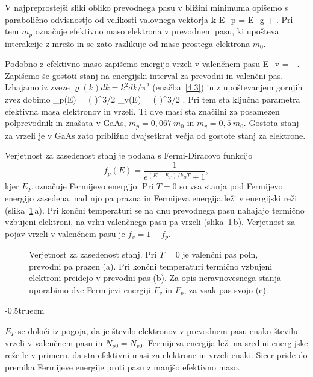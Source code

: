 V najpreprostejši sliki obliko prevodnega pasu v bližini minimuma opišemo 
s parabolično odvisnostjo od velikosti valovnega vektorja $\mathbf{k}$
\beq
E_p = E_g + .
\label{pp:Ec}
\eeq
Pri tem $m_p$ označuje efektivno maso elektrona v prevodnem pasu, ki upošteva
interakcije z mrežo in se zato razlikuje od mase prostega elektrona $m_0$.

Podobno z efektivno maso zapišemo energijo vrzeli v valenčnem pasu
\beq
E_v = - .
\label{pp:Ev}
\eeq
Zapišemo še gostoti stanj na energijski interval za prevodni in valenčni pas. Izhajamo iz zveze
$\varrho(k) dk = k^2dk /\pi^2$ (enačba~\ref{4.3}) in z upoštevanjem gornjih zvez dobimo
\beq
\varrho_p(E) = \left( \right)^{3/2} 
\qquad {}\qquad
\varrho_v(E) = \left( \right)^{3/2} .
\label{eq:rho_p}
\eeq
Pri tem sta ključna parametra efektivna masa 
elektronov in vrzeli. Ti dve masi sta značilni za posamezen polprevodnik
in znašata v GaAs, $m_p = 0,067~m_0$ in $m_v = 0,5~m_0$. 
Gostota stanj za vrzeli je v GaAs zato približno 
dvajsetkrat večja od gostote stanj za elektrone.

Verjetnost za zasedenost stanj je podana s Fermi-Diracovo funkcijo 
\begin{equation}  
f_p(E)=\frac{1}{e^{(E-E_F)/k_B T}+1},
\label{eq:7FD}
\end{equation}
kjer $E_F$ označuje Fermijevo energijo. Pri $T=0$ so vsa stanja pod 
Fermijevo energijo zasedena, nad njo pa prazna in Fermijeva energija leži
v energijski reži (slika~\ref{fig:Fermi}\,a). Pri končni temperaturi se na dnu prevodnega pasu nahajajo 
termično vzbujeni elektroni, na vrhu valenčnega pasu pa vrzeli (slika~\ref{fig:Fermi}\,b). Verjetnost 
za pojav vrzeli v valenčnem pasu je $f_v = 1 - f_p$.
\begin{figure}[h]
\centering
\def\svgwidth{145truemm} 

\caption{Verjetnost za zasedenost stanj. Pri $T=0$ je valenčni pas poln, prevodni pa prazen (a).
Pri končni temperaturi termično vzbujeni elektroni preidejo v prevodni pas (b). Za opis neravnovesnega
stanja uporabimo dve Fermijevi energiji $F_v$ in $F_p$, za vsak pas svojo (c).
}
\label{fig:Fermi}
\end{figure}
\vglue-0.5truecm
\begin{remark}
$E_F$ se določi iz pogoja, da je število elektronov v prevodnem pasu enako 
številu vrzeli v valenčnem pasu in $N_{p0} = N_{v0}$. Fermijeva energija
leži na sredini energijske reže le v primeru, da sta efektivni masi 
za elektrone in vrzeli enaki. Sicer pride do premika Fermijeve energije 
proti pasu z manjšo efektivno maso. 
\end{remark}

